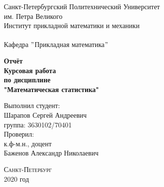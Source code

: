 \documentclass[a4]{article}
\renewcommand{\listoftables}{\begingroup %
\tocsection
\tocfile{\listtablename}{lot}
\endgroup}
\begin{document}



\def\contentsname{\LARGE{Содержание}}
\thispagestyle{empty}
\begin{center} 
	\vspace{2cm} 
	{\Large \sc Санкт-Петербургский Политехнический Университет}\\
	\vspace{2mm}
	{\Large\sc им. Петра Великого}\\
	\vspace{1cm}
	{\large \sc Институт прикладной математики и механики\\ 
		\vspace{0.5mm}
		\textsc{}}\\ 
	\vspace{0.5mm}
	{\large\sc Кафедра $"$Прикладная математика$"$}\\
	\vspace{15mm}
	
	
	{\sc \textbf{Отчёт\\
			Курсовая работа\\
			по дисциплине\\
			"Математическая статистика"}
		\vspace{6mm}
		
	}
	\vspace*{2mm}
	
	
	\begin{flushleft}
		\vspace{4cm}
		\sc Выполнил студент:\\
		\sc Шарапов Сергей Андреевич\\
		\sc группа: 3630102/70401\\
		\vspace{1cm}
		\sc Проверил:\\
		\sc к.ф-м.н., доцент\\
		\sc Баженов Александр Николаевич
		\vspace{20mm}
	\end{flushleft}
\end{center} 
\begin{center}
	\vfill {\large\textsc{Санкт-Петербург}}\\ 
	2020 год
\end{center}

\newpage
\pagestyle{plain}



\newpage
\tableofcontents{}
\newpage
\listoftables{}
\newpage
\end{document}
